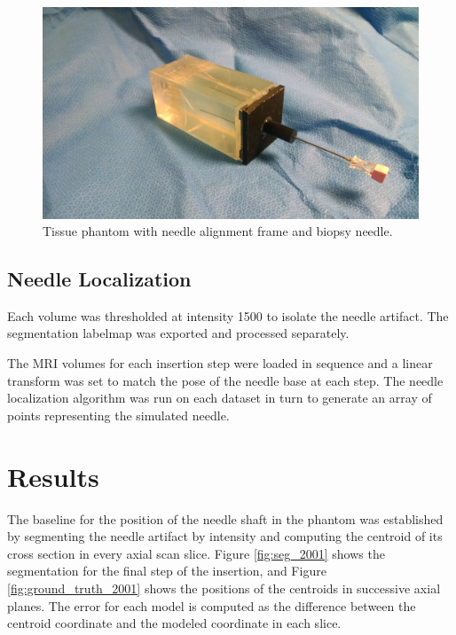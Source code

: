 \begin{figure}[h]
\includegraphics[width=1.0\textwidth]{Fig/chap5/phantom_with_needle_guide_small_2.jpg}
\caption{Tissue phantom with needle alignment frame and biopsy needle.}
\label{fig:needle_guide}
\end{figure}

\subsection{Needle Localization}

Each volume was thresholded at intensity 1500 to isolate the needle artifact. The segmentation labelmap was exported and processed separately.

The MRI volumes for each insertion step were loaded in sequence and a linear transform was set to match the pose of the needle base at each step. The needle localization algorithm was run on each dataset in turn to generate an array of points representing the simulated needle.

\section{Results}



The baseline for the position of the needle shaft in the phantom was established by segmenting the needle artifact by intensity and computing the centroid of its cross section in every axial scan slice. Figure \ref{fig:seg_2001} shows the segmentation for the final step of the insertion, and Figure \ref{fig:ground_truth_2001} shows the positions of the centroids in successive axial planes. The error for each model is computed as the difference between the centroid coordinate and the modeled coordinate in each slice.

